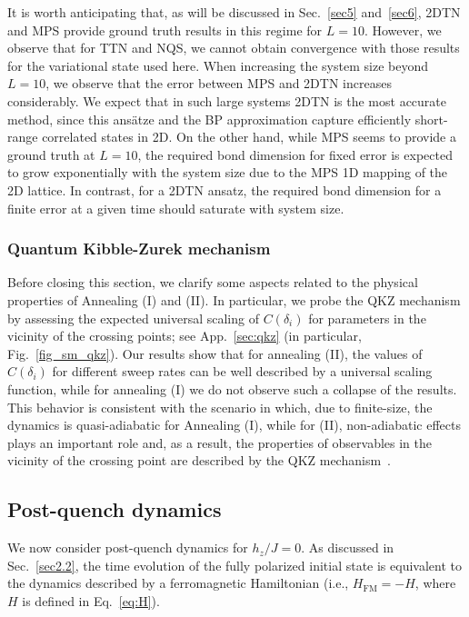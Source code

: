 \documentclass[aps,pra,reprint,amssymb,superscriptaddress]{revtex4-2}
\begin{document}
It is worth anticipating that, as will be discussed in Sec.~\ref{sec5} and~\ref{sec6}, 2DTN and MPS provide ground truth results in this regime for $L=10$. However, we observe that for TTN and NQS, we cannot obtain convergence with those results for the variational state used here. When increasing the system size beyond $L=10$, we observe that the error between MPS and 2DTN increases considerably. We expect that in such large systems 2DTN is the most accurate method, since this ansätze and the BP approximation capture efficiently short-range correlated states in 2D. On the other hand, while MPS seems to provide a ground truth at $L=10$, the required bond dimension for fixed error is expected to grow exponentially with the system size due to the MPS 1D mapping of the 2D lattice. In contrast, for a 2DTN ansatz, the required bond dimension for a finite error at a given time should saturate with system size.

\subsubsection{Quantum Kibble-Zurek mechanism} 
\label{Sec.4.1.3}

Before closing this section, we clarify some aspects related to the physical properties of Annealing (I) and (II). In particular, we probe the QKZ mechanism by assessing the expected universal scaling of $C(\delta_i)$ for parameters in the vicinity of the crossing points; see App.~\ref{sec:qkz} (in particular, Fig.~\ref{fig_sm_qkz}). Our results show that for annealing (II), the values of $C(\delta_i)$ for different sweep rates can be well described by a universal scaling function, while for annealing (I) we do not observe such a collapse of the results. This behavior is consistent with the scenario in which, due to finite-size, the dynamics is quasi-adiabatic  for Annealing (I), while for (II), non-adiabatic effects plays an important role and, as a result, the properties of observables in the vicinity of the crossing point are described by the QKZ mechanism~\cite{schmitt_quantum_2022}.


\subsection{Post-quench dynamics}

We now consider post-quench dynamics for $h_z / J = 0$. As discussed in Sec.~\ref{sec2.2}, the time evolution of the fully polarized initial state is equivalent to the dynamics described by a ferromagnetic Hamiltonian (i.e., $H_\text{FM} = -H$, where $H$ is defined in Eq.~\ref{eq:H}).
\end{document}
